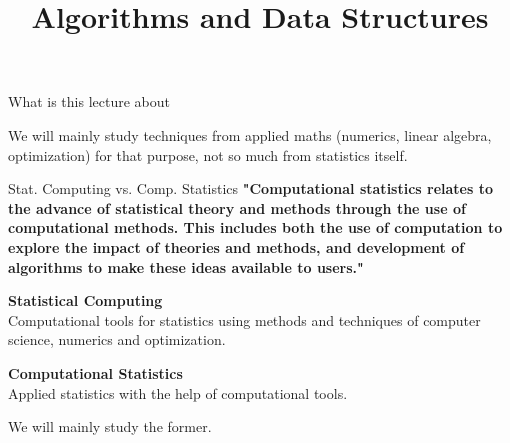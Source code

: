 \documentclass[11pt,compress,t,notes=noshow, xcolor=table]{beamer}
\title{Algorithms and Data Structures}
\begin{document}

\begin{vbframe}{What is this lecture about}

\lz

We will mainly study techniques from applied maths (numerics, linear algebra, optimization) for that purpose,
not so much from statistics itself.

\end{vbframe}

\begin{vbframe}{Stat. Computing vs. Comp. Statistics}
\textbf{"Computational statistics relates to the advance
  of statistical theory and methods through the use of computational
  methods. This includes both the use of computation to explore the
  impact of theories and methods, and development of algorithms to
  make these ideas available to users."}

\lz
\textbf{Statistical Computing}\\
Computational tools for statistics using methods and techniques of computer science, numerics and optimization.

\bigskip

\textbf{Computational Statistics}\\
Applied statistics with the help of computational tools.

\lz

We will mainly study the former.

\end{vbframe}




\end{document}
